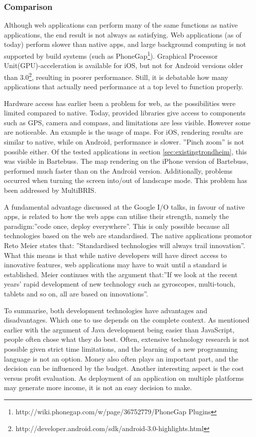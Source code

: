 \subsubsection {Comparison}
\label{sec:comparison}
Although web applications can perform many of the same functions as native applications, the end result is not always as satisfying.  Web applications (as of today) perform slower than native apps, and large background computing is not supported by build systems (such as PhoneGap\footnote{http://wiki.phonegap.com/w/page/36752779/PhoneGap Plugins}). Graphical Processor Unit(GPU)-acceleration is available for iOS, but not for Android versions older than 3.0\footnote{http://developer.android.com/sdk/android-3.0-highlights.html}, resulting in poorer performance. Still, it is debatable how many applications that actually need performance at a top level to function properly.

Hardware access has earlier been a problem for web, as the possibilities were limited compared to native. Today, provided libraries give access to components such as GPS, camera and compass, and limitations are less visible. However some are noticeable. An example is the usage of maps. For iOS, rendering results are similar to native, while on Android, performance is slower. ''Pinch zoom'' is not possible either. Of the tested applications in section \ref{sec:existingtrondheim}, this was visible in Bartebuss. The map rendering on the iPhone version of Bartebuss, performed much faster than on the Android version. Additionally, problems occurred when turning the screen into/out of landscape mode. This problem has been addressed by MultiBRIS\cite{multibris}.

A fundamental advantage discussed at the Google I/O talks, in favour of native apps, is related to how the web apps can utilise their strength, namely the paradigm:''code once, deploy everywhere''. This is only possible because all technologies based on the web are standardised. The native applications promotor Reto Meier states that: ''Standardised technologies will always trail innovation''. What this means is that while native developers will have direct access to innovative features, web applications may have to wait until a standard is established. Meier continues with the argument that:''If we look at the recent years' rapid development of new technology such as gyroscopes, multi-touch, tablets and so on, all are based on innovations''.

To summarise, both development technologies have advantages and disadvantages. Which one to use depends on the complete context. As mentioned earlier with the argument of Java development being easier than JavaScript, people often chose what they do best. Often, extensive technology research is not possible given strict time limitations, and the learning of a new programming language is not an option. Money also often plays an important part, and the decision can be influenced by the budget. Another interesting aspect is the cost versus profit evaluation. As deployment of an application on multiple platforms may generate more income, it is not an easy decision to make. 

